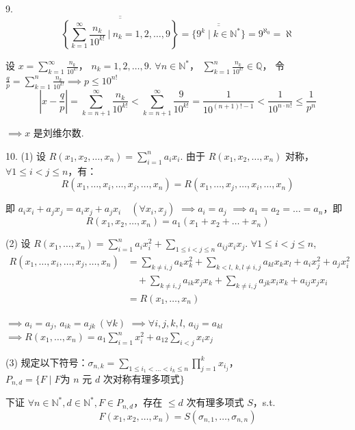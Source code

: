 \sepline

9.
$$\overline{\overline{\left\{ \sum_{k=1}^\infty \frac{n_k}{10^{k!}} \ \bigg| \ n_k=1,2,\dots,9 \right\}}} = \overline{\overline{\{ 9^k \mid k \in \mathbb{N}^* \}}} = 9^{\aleph_0} = \aleph$$

设 $x = \sum_{k=1}^\infty \frac{n_k}{10^{k!}}$， $n_k=1,2,\dots,9$. $\forall n \in \mathbb{N}^*$， $\sum_{k=1}^n \frac{n_k}{10^{k!}} \in \mathbb{Q}$， 令 $\frac{q}{p} = \sum_{k=1}^n \frac{n_k}{10^{k!}} \implies p \le 10^{n!}$
$$\left| x - \frac{q}{p} \right| = \sum_{k=n+1}^\infty \frac{n_k}{10^{k!}} < \sum_{k=n+1}^\infty \frac{9}{10^{k!}} = \frac{1}{10^{(n+1)!-1}} < \frac{1}{10^{n \cdot n!}} \le \frac{1}{p^n}$$

$\implies x$ 是刘维尔数.

\sepline

10.
(1) 设 $R(x_1, x_2, \dots, x_n) = \sum_{i=1}^n a_i x_i$. 由于 $R(x_1, x_2, \dots, x_n)$ 对称， $\forall 1 \le i < j \le n$，有：
$$R(x_1, \dots, x_i, \dots, x_j, \dots, x_n) = R(x_1, \dots, x_j, \dots, x_i, \dots, x_n)$$

即 $a_i x_i + a_j x_j = a_i x_j + a_j x_i \quad (\forall x_i, x_j)$ $\implies a_i = a_j$ $\implies a_1 = a_2 = \dots = a_n$，即
$$R(x_1, x_2, \dots, x_n) = a_1(x_1 + x_2 + \dots + x_n)$$

(2) 设 $R(x_1, \dots, x_n) = \sum_{i=1}^n a_i x_i^2 + \sum_{1 \le i < j \le n} a_{ij} x_i x_j$. $\forall 1 \le i < j \le n$, 
\begin{align*}
    R(x_1, \dots, x_i, \dots, x_j, \dots, x_n)&= \sum_{k \neq i,j} a_k x_k^2 + \sum_{k < l, \ k,l \neq i,j} a_{kl} x_k x_l + a_i x_j^2 + a_j x_i^2 \\
    &\quad + \sum_{k \neq i,j} a_{ik} x_j x_k + \sum_{k \neq i,j} a_{jk} x_i x_k + a_{ij} x_j x_i \\
    &= R(x_1, \dots, x_n)
\end{align*}

$\implies a_i = a_j$, $a_{ik} = a_{jk} \ (\forall k)$ $\implies \forall i, j, k, l$, $a_{ij} = a_{kl}$ $\implies R(x_1, \dots, x_n) = a_1 \sum_{i=1}^n x_i^2 + a_{12} \sum_{i < j} x_i x_j$

(3) 规定以下符号：$\sigma_{n,k} = \sum_{1 \le i_1 < \dots < i_k \le n} \prod_{j=1}^k x_{i_j}$，$P_{n,d} = \{ F \mid F \text{为 } n \text{ 元 } d \text{ 次对称有理多项式} \}$ 

下证 $\forall n \in \mathbb{N}^*, d \in \mathbb{N}^*, F \in P_{n,d}$，存在 $\le d$ 次有理多项式 $S$，s.t.
$$F(x_1, x_2, \dots, x_n) = S(\sigma_{n,1}, \dots, \sigma_{n,n})$$

